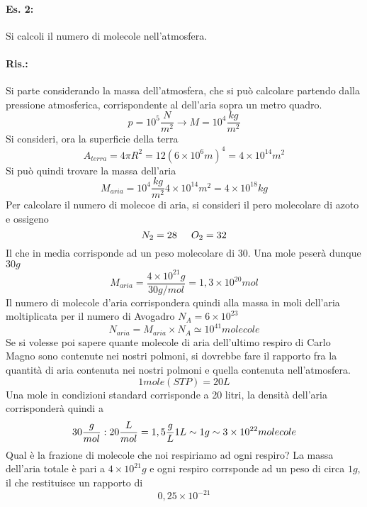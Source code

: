 \newpage
\paragraph{Es. 2:}
Si calcoli il numero di molecole nell'atmosfera.
\paragraph{Ris.:}
Si parte considerando la massa dell'atmosfera, che si può calcolare partendo dalla pressione atmosferica, corrispondente al dell'aria sopra un metro quadro.
\begin{equation}
p=10^5\frac{N}{m^2}\longrightarrow M=10^4\frac{kg}{m^2}
\end{equation}
Si consideri, ora la superficie della terra 
\begin{equation}
A_{terra}=4\pi R^2=12(6\times10^6m)^4=4\times10^14m^2
\end{equation}
Si può quindi trovare la massa dell'aria
\begin{equation}
M_{aria}=10^4\frac{kg}{m^2}4\times10^{14}m^2=4\times10^{18}kg
\end{equation}
Per calcolare il numero di molecoe di aria, si consideri il pero molecolare di azoto e ossigeno
\begin{equation}
N_2=28\hspace{0,5cm}O_2=32
\end{equation}
Il che in media corrisponde ad un peso molecolare di $30$.
Una mole peserà dunque $30g$
\begin{equation}
M_{aria}=\frac{4\times10^21g}{30g/mol}=1,3\times10^{20}mol
\end{equation}
Il numero di molecole d'aria corrispondera quindi alla massa in moli dell'aria moltiplicata per il numero di Avogadro $N_A=6\times10^{23}$
\begin{equation}
N_{aria}=M_{aria}\times N_A\simeq 10^41molecole
\end{equation}
Se si volesse poi sapere quante molecole di aria dell'ultimo respiro di Carlo Magno sono contenute nei nostri polmoni, si dovrebbe fare il rapporto fra la quantità di aria contenuta nei nostri polmoni e quella contenuta nell'atmosfera.
\begin{equation}
1mole (STP)=20L
\end{equation}
Una mole in condizioni standard corrisponde a 20 litri, la densità dell'aria corrisponderà quindi a 
\begin{equation}
30\frac{g}{mol}:20\frac{L}{mol}=1,5\frac{g}{L}\\
1L\sim 1g\sim 3\times 10^{22}molecole
\end{equation}
Qual è la frazione di molecole che noi respiriamo ad ogni respiro?
La massa dell'aria totale è pari a $4\times 10^21g$ e ogni respiro corrsponde ad un peso di circa $1g$, il che restituisce un rapporto di
\begin{equation}
0,25\times 10^{-21}
\end{equation}

